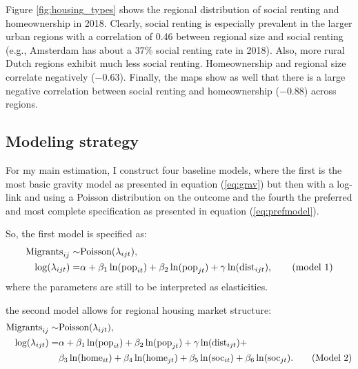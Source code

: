 \documentclass[11pt,parskip,abstracton,notitlepage, dvipsnames]{scrartcl}
\begin{document}
Figure \ref{fig:housing_types} shows the regional distribution of social renting
and homeownership in 2018. Clearly, social renting is especially prevalent in
the larger urban regions with a correlation of 0.46 between regional size and social
renting (e.g., Amsterdam has about a 37\% social renting rate in 2018). Also,
more rural Dutch regions exhibit much less social renting. Homeownership and
regional size correlate negatively ($-0.63$). Finally, the maps show as well that
there is a large negative correlation between social renting and homeownership
($-0.88$) across regions.

\subsection{Modeling strategy}

For my main estimation, I construct four baseline models, where the first is the most basic gravity model as presented in equation (\ref{eq:grav}) but then with a log-link and using a Poisson distribution on the outcome and the fourth the preferred and most complete specification as presented in equation (\ref{eq:prefmodel}).

So, the first model is specified as:
\begin{align} \text{Migrants}_{ij} \sim & \text{Poisson}(\lambda_{ijt}), \notag \\
  \log(\lambda_{ijt}) = & \alpha +
                          \beta_1 \ln(\text{pop}_{it}) +
                          \beta_2 \ln(\text{pop}_{jt}) +
                          \gamma \ln(\text{dist}_{ijt}),  
\tag{model 1}\label{eq:m1}
\end{align}
where the parameters are still to be interpreted as elasticities.

the second model allows for regional housing market structure:
\begin{align} \text{Migrants}_{ij} \sim & \text{Poisson}(\lambda_{ijt}), \notag \\
  \log(\lambda_{ijt}) = & \alpha + \beta_1 \ln(\text{pop}_{it}) + \beta_2
                          \ln(\text{pop}_{jt}) +
                          \gamma \ln(\text{dist}_{ijt}) + \notag \\
                                        & \beta_3 \ln(\text{home}_{it}) +
                                          \beta_4 \ln(\text{home}_{jt}) +
                                          \beta_5 \ln(\text{soc}_{it}) + \beta_6
                                          \ln(\text{soc}_{jt}). \tag{Model
                                          2} \label{eq:m2}
\end{align}
\end{document}
